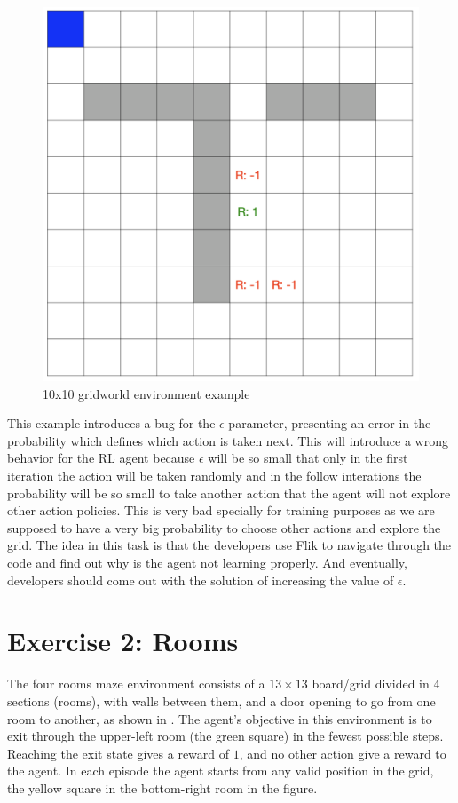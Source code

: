 \begin{figure}[h]
  \centering
  \includegraphics[width=0.5\columnwidth]{figures/gridworld.png}
  \caption{10x10 gridworld environment example}
  \label{fig:gridworld}
\end{figure}

This example introduces a bug for the $\epsilon$ parameter, presenting an error in the probability which
defines which action is taken next. This will introduce a wrong behavior for the \ac{RL} 
agent because $\epsilon$ will be so small that only in the first iteration the action will be taken randomly 
and in the follow interations the probability will be so small to take another action that the agent will not explore
other action policies. This is very bad specially for training purposes as we are supposed to have a very big 
probability to choose other actions and explore the grid. The idea in this task is that the developers
use \ac{Flik} to navigate through the code and find out why is the agent not learning properly. And eventually,
developers should come out with the solution of increasing the value of $\epsilon$. 

\section{Exercise 2: Rooms}
\label{sec:rooms-eval}

The four rooms maze environment consists of a $13\times 13$ board/grid divided in $4$ sections 
(\ie rooms), with walls between them, and a door opening to go from one room to another, as shown 
in . The agent's objective in this environment is to exit through the upper-left room 
(the green square) in the fewest possible steps. Reaching the exit state gives a reward of $1$, and no 
other action give a reward to the agent. In each episode the agent starts from any valid position in the 
grid, \eg the yellow square in the bottom-right room in the figure. 

